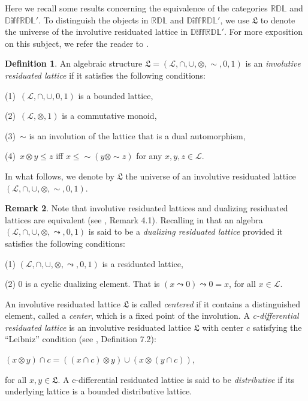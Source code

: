 \documentclass[final,12pt,times]{elsarticle}
\theoremstyle{plain}
\theoremstyle{definition}
\newtheorem{definition}{Definition}[section]
\newtheorem{remark}[definition]{Remark}
\theoremstyle{break}
\begin{document}
Here we recall some results concerning the equivalence of the categories $\mathbb{RDL}$ and $\mathbb{D\text{iff}RDL'}$. To distinguish the objects in $\mathbb{RDL}$ and $\mathbb{D\text{iff}RDL'}$, we use $\boldsymbol{\mathfrak{L}}$ to denote the universe of the involutive residuated lattice in $\mathbb{D\text{iff}RDL'}$. For more exposition on this subject, we refer the reader to \cite{Galatosb,Castiglionib,Castiglionic}.


\begin{definition}\label{definition2.3.}\cite{Galatosb} An algebraic structure $\boldsymbol{\mathfrak{L}}=(\mathcal{L},\cap,\cup,\otimes,{\sim},0,1)$ is an \emph{involutive residuated lattice} if it satisfies the following conditions:

(1)\ $(\mathcal{L},\cap,\cup,0,1)$ is a bounded lattice,

(2)\ $(\mathcal{L},\otimes,1)$ is a commutative monoid,

(3)\ ${\sim}$ is an involution of the lattice that is a dual automorphism,

(4)\ $x\otimes y\leq z$ iff $x\leq {\sim}(y\otimes {\sim} z)$ for any $x,y,z\in \mathcal{L}$.
\end{definition}
In what follows, we denote by $\boldsymbol{\mathfrak{L}}$ the universe of an involutive residuated lattice $(\mathcal{L},\cap,\cup,\otimes,{\sim},0,1)$.

\begin{remark}\label{remark2.4.} Note that involutive residuated lattices and dualizing residuated lattices are equivalent (see  \cite{Castiglionib}, Remark 4.1). Recalling in \cite{Castiglionib} that an algebra $(\mathcal{L},\cap,\cup,\otimes,\leadsto,0,1)$ is said to be a \emph{dualizing residuated lattice} provided it satisfies the following conditions:

(1) $(\mathcal{L},\cap,\cup,\otimes,\leadsto,0,1)$ is a residuated lattice,

(2) $0$ is a cyclic dualizing element. That is
$(x\leadsto 0)\leadsto 0=x$, for all $x\in \mathcal{L}$.
\end{remark}

An involutive residuated lattice $\boldsymbol{\mathfrak{L}}$ is called \emph{centered} if it contains a distinguished element, called a \emph{center}, which is a fixed point of the involution. A \emph{c-differential residuated lattice} is an involutive residuated lattice $\boldsymbol{\mathfrak{L}}$ with center $c$ satisfying the ``Leibniz''
 condition (see \cite{Castiglionib}, Definition 7.2):
\begin{center} 
$(x \otimes y) \cap c = ((x \cap c) \otimes y) \cup (x \otimes (y \cap c))$,
\end{center}
for all $x,y \in \boldsymbol{\mathfrak{L}}$. A c-differential residuated lattice is said to be \emph{distributive} if its underlying lattice is a bounded distributive lattice. \medskip
\end{document}
